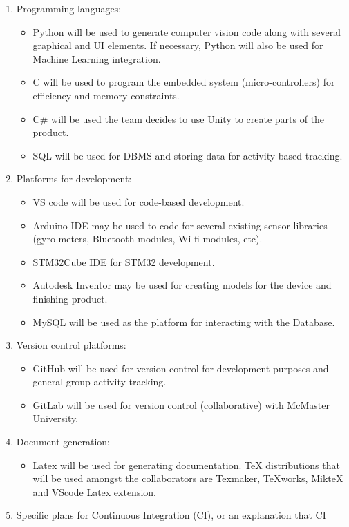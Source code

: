 \documentclass{article}
\begin{document}
\begin{enumerate}
\item Programming languages:
\begin{itemize}
\item Python will be used to generate computer vision code along with several graphical and UI elements. If necessary, Python will also be used for Machine Learning integration.
\item C will be used to program the embedded system (micro-controllers) for efficiency and memory constraints.
\item C\# will be used the team decides to use Unity to create parts of the product.
\item SQL will be used for DBMS and storing data for activity-based tracking.
\end{itemize}
\item Platforms for development:
\begin{itemize}
\item VS code will be used for code-based development.
\item Arduino IDE may be used to code for several existing sensor libraries (gyro meters, Bluetooth modules, Wi-fi modules, etc).
\item STM32Cube IDE for STM32 development. 
\item Autodesk Inventor may be used for creating models for the device and finishing product.
\item MySQL will be used as the platform for interacting with the Database.
\end{itemize}
\item Version control platforms:
\begin{itemize}
\item GitHub will be used for version control for development purposes and general group activity tracking.
\item GitLab will be used for version control (collaborative) with McMaster University.
\end{itemize}
\item Document generation:
\begin{itemize}
\item Latex will be used for generating documentation. TeX distributions that will be used amongst the collaborators are  Texmaker, TeXworks, MikteX and VScode Latex extension.
\end{itemize}
\item Specific plans for Continuous Integration (CI), or an explanation that CI

\end{enumerate}
\end{document}
